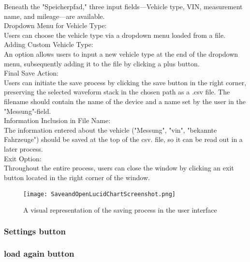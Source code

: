 \documentclass{scrreprt}
\begin{document}
Beneath the "Speicherpfad," three input fields—Vehicle type, VIN, measurement name, and mileage—are available.\\

Dropdown Menu for Vehicle Type:\\

Users can choose the vehicle type via a dropdown menu loaded from a file.\\

Adding Custom Vehicle Type:\\

An option allows users to input a new vehicle type at the end of the dropdown menu, subsequently adding it to the file by clicking a plus button.\\

Final Save Action:\\

Users can initiate the save process by clicking the save button in the right corner, preserving the selected waveform stack in the chosen path as a .csv file. The filename should contain the name of the device and a name set by the user in the "Messung"-field.\\

Information Inclusion in File Name:\\

The information entered about the vehicle ("Messung", "vin", "bekannte Fahrzeuge") should be saved at the top of the csv. file, so it can be read out in a later process.\\
Exit Option:\\

Throughout the entire process, users can close the window by clicking an exit button located in the right corner of the window.\\


\begin{figure}
    \texttt{[image: SaveandOpenLucidChartScreenshot.png]}
    \caption[]{A visual representation of the saving process in the user interface}
    \label{fig:saveData}
\end{figure}

\subsubsection{Settings button}

\subsubsection{load again button}
\end{document}

